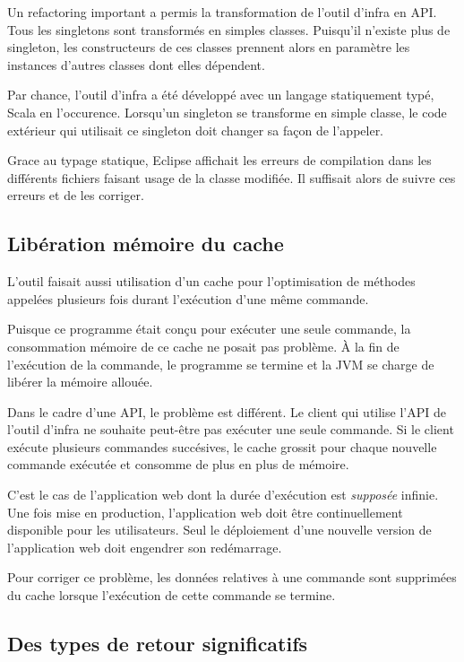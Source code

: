 Un refactoring important a permis la transformation de l'outil d'infra en API.
Tous les singletons sont transformés en simples classes.
Puisqu'il n'existe plus de singleton, les constructeurs de ces classes prennent
alors en paramètre les instances d'autres classes dont elles dépendent.

Par chance, l'outil d'infra a été développé avec un langage statiquement
typé, Scala en l'occurence.
Lorsqu'un singleton se transforme en simple classe, le code extérieur qui
utilisait ce singleton doit changer sa façon de l'appeler.

Grace au typage statique, Eclipse affichait les erreurs de compilation dans
les différents fichiers faisant usage de la classe modifiée. Il suffisait alors
de suivre ces erreurs et de les corriger.

\subsection{Libération mémoire du cache}

L'outil faisait aussi utilisation d'un cache pour l'optimisation de méthodes
appelées plusieurs fois durant l'exécution d'une même commande.

Puisque ce programme était conçu pour exécuter une seule commande, la
consommation mémoire de ce cache ne posait pas problème.
À la fin de l'exécution de la commande, le programme se termine et la JVM
se charge de libérer la mémoire allouée.

Dans le cadre d'une API, le problème est différent. Le client qui utilise l'API
de l'outil d'infra ne souhaite peut-être pas exécuter une seule commande.
Si le client exécute plusieurs commandes succésives, le cache grossit pour
chaque nouvelle commande exécutée et consomme de plus en plus de mémoire.

C'est le cas de l'application web dont la durée d'exécution est \textit{supposée}
infinie. Une fois mise en production, l'application web doit être
continuellement disponible pour les utilisateurs. Seul le déploiement d'une
nouvelle version de l'application web doit engendrer son redémarrage.

Pour corriger ce problème, les données relatives à une commande sont supprimées
du cache lorsque l'exécution de cette commande se termine.

\subsection{Des types de retour significatifs}

